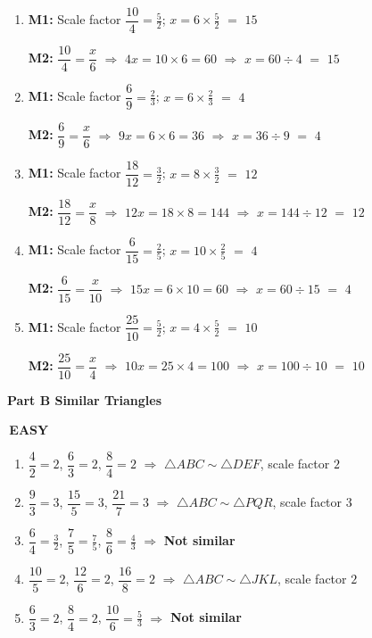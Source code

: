 \documentclass[11pt]{article}
\newcommand{\parttitle}[2]{\needspace{6cm}\vspace{4mm}%
  {\colorbox{fmtitle}{\parbox{\dimexpr\linewidth-2\fboxsep}{\color{white}\bfseries\large Part #1 \quad #2}}}\par\vspace{3mm}}
\newcommand{\ans}[1]{\textcolor{fmans}{\textbf{#1}}}
\newcommand{\leveltag}[2]{\colorbox{#1}{\color{white}\bfseries\small\,#2\,}}
\begin{document}
\begin{enumerate}[label=\textbf{\arabic*.},start=6,itemsep=2mm,leftmargin=*]
\item \textbf{M1:} Scale factor $\dfrac{10}{4} = \tfrac{5}{2}$; \; $x = 6 \times \tfrac{5}{2}$ $=$ \ans{$15$}\par\textbf{M2:} $\dfrac{10}{4} = \dfrac{x}{6}$ \;$\Rightarrow$\; $4x = 10 \times 6 = 60$ \;$\Rightarrow$\; $x = 60 \div 4$ $=$ \ans{$15$}
\item \textbf{M1:} Scale factor $\dfrac{6}{9} = \tfrac{2}{3}$; \; $x = 6 \times \tfrac{2}{3}$ $=$ \ans{$4$}\par\textbf{M2:} $\dfrac{6}{9} = \dfrac{x}{6}$ \;$\Rightarrow$\; $9x = 6 \times 6 = 36$ \;$\Rightarrow$\; $x = 36 \div 9$ $=$ \ans{$4$}
\item \textbf{M1:} Scale factor $\dfrac{18}{12} = \tfrac{3}{2}$; \; $x = 8 \times \tfrac{3}{2}$ $=$ \ans{$12$}\par\textbf{M2:} $\dfrac{18}{12} = \dfrac{x}{8}$ \;$\Rightarrow$\; $12x = 18 \times 8 = 144$ \;$\Rightarrow$\; $x = 144 \div 12$ $=$ \ans{$12$}
\item \textbf{M1:} Scale factor $\dfrac{6}{15} = \tfrac{2}{5}$; \; $x = 10 \times \tfrac{2}{5}$ $=$ \ans{$4$}\par\textbf{M2:} $\dfrac{6}{15} = \dfrac{x}{10}$ \;$\Rightarrow$\; $15x = 6 \times 10 = 60$ \;$\Rightarrow$\; $x = 60 \div 15$ $=$ \ans{$4$}
\item \textbf{M1:} Scale factor $\dfrac{25}{10} = \tfrac{5}{2}$; \; $x = 4 \times \tfrac{5}{2}$ $=$ \ans{$10$}\par\textbf{M2:} $\dfrac{25}{10} = \dfrac{x}{4}$ \;$\Rightarrow$\; $10x = 25 \times 4 = 100$ \;$\Rightarrow$\; $x = 100 \div 10$ $=$ \ans{$10$}
\end{enumerate}
\parttitle{B}{Similar Triangles}
\leveltag{fmwatch}{EASY}\par\vspace{1mm}
\begin{enumerate}[label=\textbf{\arabic*.},start=1,itemsep=2mm,leftmargin=*]
\item $\dfrac{4}{2} = 2$, \; $\dfrac{6}{3} = 2$, \; $\dfrac{8}{4} = 2$ \;$\Rightarrow$\; \ans{$\triangle ABC \sim \triangle DEF$}, scale factor \ans{$2$}
\item $\dfrac{9}{3} = 3$, \; $\dfrac{15}{5} = 3$, \; $\dfrac{21}{7} = 3$ \;$\Rightarrow$\; \ans{$\triangle ABC \sim \triangle PQR$}, scale factor \ans{$3$}
\item $\dfrac{6}{4} = \tfrac{3}{2}$, \; $\dfrac{7}{5} = \tfrac{7}{5}$, \; $\dfrac{8}{6} = \tfrac{4}{3}$ \;$\Rightarrow$\; \ans{Not similar}
\item $\dfrac{10}{5} = 2$, \; $\dfrac{12}{6} = 2$, \; $\dfrac{16}{8} = 2$ \;$\Rightarrow$\; \ans{$\triangle ABC \sim \triangle JKL$}, scale factor \ans{$2$}
\item $\dfrac{6}{3} = 2$, \; $\dfrac{8}{4} = 2$, \; $\dfrac{10}{6} = \tfrac{5}{3}$ \;$\Rightarrow$\; \ans{Not similar}
\end{enumerate}
\end{document}
